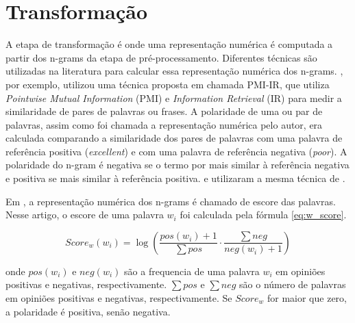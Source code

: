 \documentclass[template.tex]{subfiles}
\begin{document}
\section{Transformação}

%
%
%
%
%
%
%
%

A etapa de transformação é onde uma representação numérica é computada a partir dos n-grams da etapa de pré-processamento. Diferentes técnicas são utilizadas na literatura para calcular essa representação numérica dos n-grams. , por exemplo, utilizou uma técnica proposta em  chamada PMI-IR, que utiliza \textit{Pointwise Mutual Information} (PMI) e \textit{Information Retrieval} (IR) para medir a similaridade de pares de palavras ou frases. A polaridade de uma ou par de palavras, assim como foi chamada a representação numérica pelo autor, era calculada comparando a similaridade dos pares de palavras com uma palavra de referência positiva  (\textit{excellent}) e com uma palavra de referência negativa (\textit{poor}). A polaridade do n-gram é negativa se o termo por mais similar à referência negativa e positiva se mais similar à referência positiva.  e  utilizaram a mesma técnica de \cite{turney2002thumbs}.

Em , a representação numérica dos n-grams é chamado de escore das palavras. Nesse artigo, o escore de uma palavra $w_i$ foi calculada pela fórmula \ref{eq:w_score}.

\begin{equation}
Score_w(w_i) = \log(\frac{pos(w_i) + 1}{\sum pos} \cdot \frac{\sum neg}{neg(w_i) + 1})
\label{eq:w_score}
\end{equation}

onde $pos(w_i)$ e $neg(w_i)$ são a frequencia de uma palavra $w_i$ em opiniões positivas e negativas, respectivamente. $\sum pos$ e $\sum neg$ são o número de palavras em opiniões positivas e negativas, respectivamente. Se $Score_w$ for maior que zero, a polaridade é positiva, senão negativa.
\end{document}
